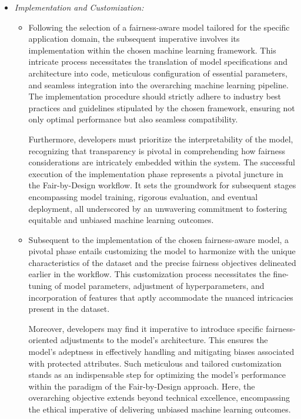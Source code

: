 \begin{itemize}
\begin{itemize}
    \end{itemize}
    
    \item \emph{Implementation and Customization:}
    
    \begin{itemize}
    
        \item Following the selection of a fairness-aware model tailored for the specific application domain, the subsequent imperative involves its implementation within the chosen machine learning framework. This intricate process necessitates the translation of model specifications and architecture into code, meticulous configuration of essential parameters, and seamless integration into the overarching machine learning pipeline. The implementation procedure should strictly adhere to industry best practices and guidelines stipulated by the chosen framework, ensuring not only optimal performance but also seamless compatibility.

        Furthermore, developers must prioritize the interpretability of the model, recognizing that transparency is pivotal in comprehending how fairness considerations are intricately embedded within the system. The successful execution of the implementation phase represents a pivotal juncture in the Fair-by-Design workflow. It sets the groundwork for subsequent stages encompassing model training, rigorous evaluation, and eventual deployment, all underscored by an unwavering commitment to fostering equitable and unbiased machine learning outcomes.    
    
        \item Subsequent to the implementation of the chosen fairness-aware model, a pivotal phase entails customizing the model to harmonize with the unique characteristics of the dataset and the precise fairness objectives delineated earlier in the workflow. This customization process necessitates the fine-tuning of model parameters, adjustment of hyperparameters, and incorporation of features that aptly accommodate the nuanced intricacies present in the dataset.

        Moreover, developers may find it imperative to introduce specific fairness-oriented adjustments to the model's architecture. This ensures the model's adeptness in effectively handling and mitigating biases associated with protected attributes. Such meticulous and tailored customization stands as an indispensable step for optimizing the model's performance within the paradigm of the Fair-by-Design approach. Here, the overarching objective extends beyond technical excellence, encompassing the ethical imperative of delivering unbiased machine learning outcomes.    
    
    \end{itemize}

\end{itemize}

